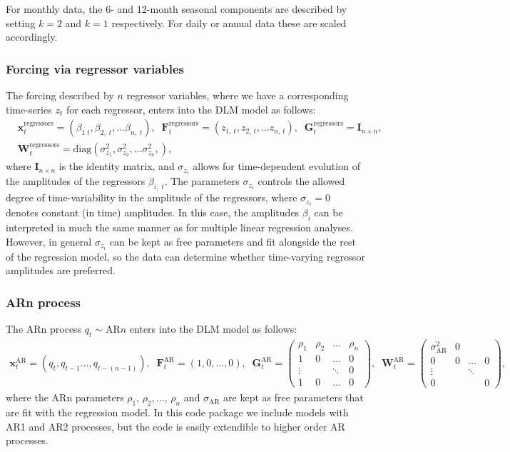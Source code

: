 \documentclass[a4paper, oneside, final]{scrartcl}
\begin{document}
For monthly data, the 6- and 12-month seasonal components are described by setting $k=2$ and $k=1$ respectively. For daily or annual data these are scaled accordingly.
%
\subsubsection*{Forcing via regressor variables}
%
The forcing described by $n$ regressor variables, where we have a corresponding time-series $z_t$ for each regressor, enters into the DLM model as follows:
\begin{align}
&\mathbf{x}^\mathrm{regressors}_t = \left(\beta_{1\;t}, \beta_{2,\;t}, \dots \beta_{n,\;t}\right),\;\;\mathbf{F}^\mathrm{regressors}_t = \left(z_{1,\,t}, z_{2,\,t}, \dots z_{n,\,t}\right),\;\;\mathbf{G}^\mathrm{regressors}_t = \mathbf{I}_{n\times n},\nonumber \\
&\mathbf{W}^\mathrm{regressors}_t=\mathrm{diag}\left(\sigma_{z_1}^2, \sigma_{z_2}^2, \dots \sigma_{z_n}^2, \right),
\end{align}
where $\mathbf{I}_{n\times n}$ is the identity matrix, and $\sigma_{z_i}$ allows for time-dependent evolution of the amplitudes of the regressors $\beta_{i,\;t}$. The parameters $\sigma_{z_i}$ controls the allowed degree of time-variability in the amplitude of the regressors, where $\sigma_{z_i}=0$ denotes constant (in time) amplitudes. In this case, the amplitudes $\beta_i$ can be interpreted in much the same manner as for multiple linear regression analyses. However, in general $\sigma_{z_i}$ can be kept as free parameters and fit alongside the rest of the regression model, so the data can determine whether time-varying regressor amplitudes are preferred.
%
\subsubsection*{ARn process}
%
The ARn process $q_t\sim\mathrm{AR}n$ enters into the DLM model as follows:
\begin{align}
\label{dlmlast}
\mathbf{x}^\mathrm{AR}_t = \left(q_t, q_{t-1}\dots,q_{t-(n-1)}\right),\;\;\mathbf{F}^\mathrm{AR}_t = \left(1, 0,\dots,0\right),\;\;\mathbf{G}^\mathrm{AR}_t = \begin{pmatrix} \rho_1 & \rho_2 & \dots & \rho_n \\
1 & 0 & \dots & 0 \\
\vdots & & \ddots & 0 \\
1 & 0 & \dots &0 \end{pmatrix},\;\;\mathbf{W}^\mathrm{AR}_t = \begin{pmatrix} \sigma_\mathrm{AR}^2 & 0 \\
0 & 0 & \dots & 0 \\
\vdots & & \ddots & \\
0 & & & 0\end{pmatrix},
\end{align}
where the ARn parameters $\rho_1$, $\rho_2,\dots,\,\rho_n$ and $\sigma_\mathrm{AR}$ are kept as free parameters that are fit with the regression model. In this code package we include models with AR1 and AR2 processes, but the code is easily extendible to higher order AR processes.
%
\end{document}
